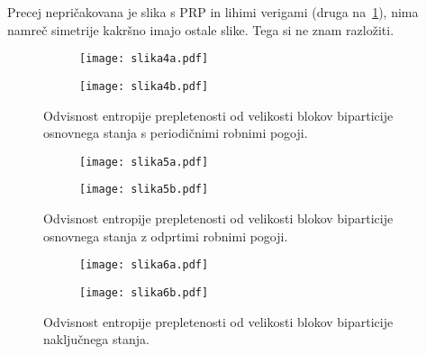 \documentclass[a4paper]{article}
\begin{document}
    Precej nepričakovana je slika s PRP in lihimi verigami (druga na~\ref{slika4}), nima namreč simetrije kakršno imajo ostale slike. Tega si ne 
    znam razložiti.

    \begin{figure}
        \centering
        \begin{subfigure}{\textwidth}
            \texttt{[image: slika4a.pdf]}
        \end{subfigure}
        \begin{subfigure}{\textwidth}
            \texttt{[image: slika4b.pdf]}
        \end{subfigure}
        \caption{Odvisnost entropije prepletenosti od velikosti blokov biparticije osnovnega stanja s periodičnimi robnimi pogoji.}
        \label{slika4}
    \end{figure}

    \begin{figure}
        \centering
        \begin{subfigure}{\textwidth}
            \texttt{[image: slika5a.pdf]}
        \end{subfigure}
        \begin{subfigure}{\textwidth}
            \texttt{[image: slika5b.pdf]}
        \end{subfigure}
        \caption{Odvisnost entropije prepletenosti od velikosti blokov biparticije osnovnega stanja z odprtimi robnimi pogoji.}
        \label{slika5}
    \end{figure}

    \begin{figure}
        \centering
        \begin{subfigure}{\textwidth}
            \texttt{[image: slika6a.pdf]}
        \end{subfigure}
        \begin{subfigure}{\textwidth}
            \texttt{[image: slika6b.pdf]}
        \end{subfigure}
        \caption{Odvisnost entropije prepletenosti od velikosti blokov biparticije naključnega stanja.}
        \label{slika6}
    \end{figure}
\end{document}
